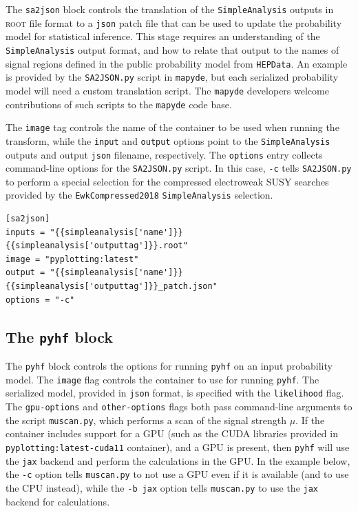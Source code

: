 \documentclass{article}
\newcommand{\mapyde}{\texttt{mapyde}}
\newcommand{\simpleanalysis}{\texttt{SimpleAnalysis}}
\newcommand{\pyhf}{\texttt{pyhf}}
\newcommand{\hepdata}{\texttt{HEPData}}
\newcommand{\ROOT}{\textsc{root}}
\newcommand{\json}{\texttt{json}}
\newcommand{\toml}{\textsc{toml}}
\begin{document}
The \texttt{sa2json} block controls the translation of the \simpleanalysis{} outputs in \ROOT{} file format to a \json{} patch file that can be used to update the probability model for statistical inference.  This stage requires an understanding of the \simpleanalysis{} output format, and how to relate that output to the names of signal regions defined in the public probability model from \hepdata.  An example is provided by the \texttt{SA2JSON.py} script in \mapyde, but each serialized probability model will need a custom translation script.  The \mapyde{} developers welcome contributions of such scripts to the \mapyde{} code base.

The \texttt{image} tag controls the name of the container to be used when running the transform, while the \texttt{input} and \texttt{output} options point to the \simpleanalysis{} outputs and output \json{} filename, respectively.  The \texttt{options} entry collects command-line options for the \texttt{SA2JSON.py} script.  In this case, \texttt{-c} tells \texttt{SA2JSON.py} to perform a special selection for the compressed electroweak SUSY searches provided by the \texttt{EwkCompressed2018} \simpleanalysis{} selection.

\begin{listing}[H]
	\begin{verbatim}
[sa2json]
inputs = "{{simpleanalysis['name']}}{{simpleanalysis['outputtag']}}.root"
image = "pyplotting:latest"
output = "{{simpleanalysis['name']}}{{simpleanalysis['outputtag']}}_patch.json"
options = "-c"
        \end{verbatim}
	\caption{The \texttt{sa2json} block of an example \toml{} configuration file for generating slepton events.}
	\label{slepton-config-sa2json}
\end{listing}

\subsection{The \texttt{pyhf} block}
\label{ssec:the-pyhf-block}

The \texttt{pyhf} block controls the options for running \pyhf{} on an input probability model.  The \texttt{image} flag controls the container to use for running \pyhf.  The serialized model, provided in \json{} format, is specified with the \texttt{likelihood} flag.  The \texttt{gpu-options} and \texttt{other-options} flags both pass command-line arguments to the script \texttt{muscan.py}, which performs a scan of the signal strength $\mu$.  If the container includes support for a GPU (such as the CUDA libraries provided in \texttt{pyplotting:latest-cuda11} container), and a GPU is present, then \pyhf{} will use the \texttt{jax} backend and perform the calculations in the GPU.  In the example below, the \texttt{-c} option tells \texttt{muscan.py} to not use a GPU even if it is available (and to use the CPU instead), while the \texttt{-b jax} option tells \texttt{muscan.py} to use the \texttt{jax} backend for calculations.
\end{document}
